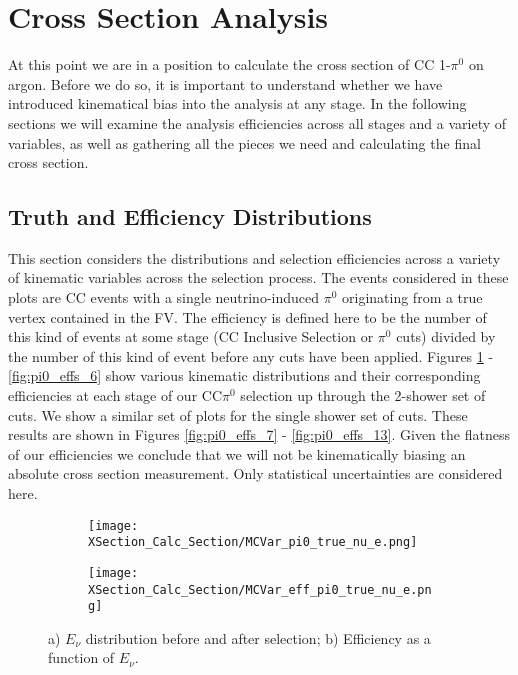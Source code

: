 \clearpage
\section{Cross Section Analysis}
\par At this point we are in a position to calculate the cross section of CC 1-$\pi^0$ on argon.  Before we do so, it is important to understand whether we have introduced kinematical bias into the analysis at any stage.  In the following sections we will examine the analysis efficiencies across all stages and a variety of variables, as well as gathering all the pieces we need and calculating the final cross section.

\subsection{Truth and Efficiency Distributions}
This section considers the distributions and selection efficiencies across a variety of kinematic variables across the selection process.  The events considered in these plots are CC events with a single neutrino-induced $\pi^0$ originating from a true vertex contained in the FV. The efficiency is defined here to be the number of this kind of events at some stage (CC Inclusive Selection or $\pi^0$ cuts) divided by the number of this kind of event before any cuts have been applied.  Figures \ref{fig:pi0_effs_0} - \ref{fig:pi0_effs_6} show various kinematic distributions and their corresponding efficiencies at each stage of our CC$\pi^0$ selection up through the 2-shower set of cuts.  We show a similar set of plots for the single shower set of cuts.  These results are shown in Figures \ref{fig:pi0_effs_7} - \ref{fig:pi0_effs_13}. Given the flatness of our efficiencies we conclude that we will not be kinematically biasing an absolute cross section measurement. Only statistical uncertainties are considered here. 

\begin{figure}[h!]
\centering

 \begin{subfigure}[t]{0.39\textwidth}
    \centering
    \texttt{[image: XSection\_Calc\_Section/MCVar\_pi0\_true\_nu\_e.png]}
  \caption{ }
  \end{subfigure} 
  \hspace{20mm}
  \begin{subfigure}[t]{0.39\textwidth}
    \centering
\texttt{[image: XSection\_Calc\_Section/MCVar\_eff\_pi0\_true\_nu\_e.png]}
  \caption{ }
  \end{subfigure} 
\caption{a) $E_\nu$ distribution before and after selection; b) Efficiency as a function of $E_\nu$. }
\label{fig:pi0_effs_0}
\end{figure}

